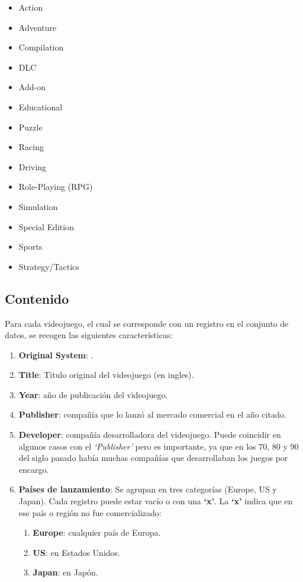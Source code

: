 \documentclass[]{article}
\providecommand{\tightlist}{%
  \setlength{\itemsep}{0pt}\setlength{\parskip}{0pt}}
\begin{document}
\begin{itemize}
\tightlist
\item
  Action
\item
  Adventure
\item
  Compilation
\item
  DLC
\item
  Add-on
\item
  Educational
\item
  Puzzle
\item
  Racing
\item
  Driving
\item
  Role-Playing (RPG)
\item
  Simulation
\item
  Special Edition
\item
  Sports
\item
  Strategy/Tactics
\end{itemize}

\subsection{Contenido}\label{contenido}

Para cada videojuego, el cual se corresponde con un registro en el
conjunto de datos, se recogen las siguientes características:

\begin{enumerate}
\def\labelenumi{\arabic{enumi}.}
\tightlist
\item
  \textbf{Original System}: .
\item
  \textbf{Title}: Titulo original del videojuego (en ingles).
\item
  \textbf{Year}: año de publicación del videojuego.
\item
  \textbf{Publisher}: compañía que lo lanzó al mercado comercial en el
  año citado.
\item
  \textbf{Developer}: compañía desarrolladora del videojuego. Puede
  coincidir en algunos casos con el \emph{`Publisher'} pero es
  importante, ya que en los 70, 80 y 90 del siglo pasado había muchas
  compañías que desarrollaban los juegos por encargo.
\item
  \textbf{Países de lanzamiento}: Se agrupan en tres categorías (Europe,
  US y Japan). Cada registro puede estar vacío o con una \textbf{`x'}.
  La \textbf{`x'} indica que en ese país o región no fue comercializado:

  \begin{enumerate}
  \def\labelenumii{\arabic{enumii}.}
  \tightlist
  \item
    \textbf{Europe}: cualquier país de Europa.\\
  \item
    \textbf{US}: en Estados Unidos.\\
  \item
    \textbf{Japan}: en Japón.
  \end{enumerate}
\end{enumerate}
\end{document}
